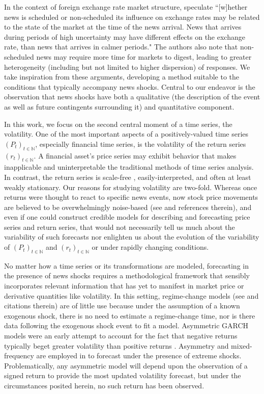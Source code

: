 \documentclass[11pt,3p,review,authoryear]{elsarticle}
\theoremstyle{definition}
\begin{document}
In the context of foreign exchange rate market structure, \citet{dominguez2006defines} speculate ``[w]hether news is scheduled or non-scheduled its influence on exchange rates may be related to the state of the market at the time of the news arrival.  News that arrives during periods of high uncertainty may have different effects on the exchange rate, than news that arrives in calmer periods." The authors also note that non-scheduled news may require more time for markets to digest, leading to greater heterogeneity (including but not limited to higher dispersion) of responses.  We take inspiration from these arguments, developing a method suitable to the conditions that typically accompany news shocks.  Central to our endeavor is the observation that news shocks have both a qualitative (the description of the event as well as future contingents surrounding it) and quantitative component.%

In this work, we focus on the second central moment of a time series, the volatility.  One of the most important aspects of a positively-valued time series $(P_{t})_{t\in\mathbb{N}}$, especially financial time series, is the volatility of the return series $(r_{t})_{t\in\mathbb{N}}$.  A financial asset's price series may exhibit behavior that makes inapplicable and uninterpretable the traditional methods of time series analysis.  In contrast, the return series is scale-free \citep{tsay2005analysis}, easily-interpreted, and often at least weakly stationary.  Our reasons for studying volatility are two-fold.  Whereas once returns were thought to react to specific news events, now stock price movements are believed to be overwhelmingly noise-based (see \citet{boudoukh2019information} and references therein), and even if one could construct credible models for describing and forecasting price series and return series, that would not necessarily tell us much about the variability of such forecasts nor enlighten us about the evolution of the variability of $(P_{t})_{t\in\mathbb{N}}$ and $(r_{t})_{t\in\mathbb{N}}$ or under rapidly changing conditions. 

No matter how a time series or its transformations are modeled, forecasting in the presence of news shocks requires a methodological framework that sensibly incorporates relevant information that has yet to manifest in market price or derivative quantities like volatility.  In this setting, regime-change models (see \citet{bauwens2006regime} and citations therein) are of little use because under the assumption of a known exogenous shock, there is no need to estimate a regime-change time, nor is there data following the exogenous shock event to fit a model.  Asymmetric GARCH models were an early attempt to account for the fact that negative returns typically beget greater volatility than positive returns \citep{hansen2012realized}.  Asymmetry and mixed-frequency are employed in \cite{wang2020forecasting} to forecast under the presence of extreme shocks.  Problematically, any asymmetric model will depend upon the observation of a signed return to provide the most updated volatility forecast, but under the circumstances posited herein, no such return has been observed.
\end{document}
